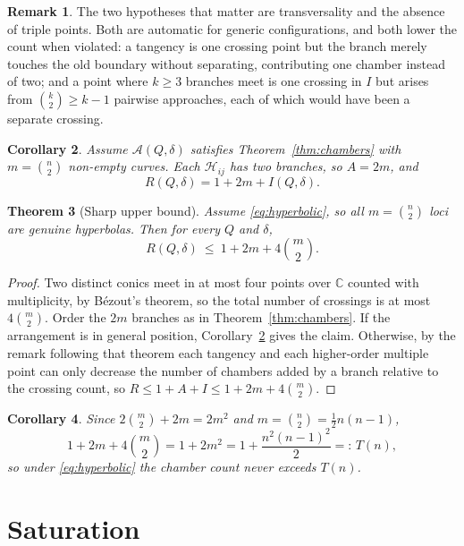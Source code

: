 ﻿\documentclass[11pt,a4paper]{article}
\newtheorem{theorem}{Theorem}[section]
\newtheorem{corollary}[theorem]{Corollary}
\theoremstyle{definition}
\newtheorem{remark}[theorem]{Remark}
\theoremstyle{remark}
\newcommand{\CC}{\mathbb{C}}
\newcommand{\HH}{\mathcal{H}}
\newcommand{\ARR}{\mathcal{A}}
\begin{document}
\begin{remark}
The two hypotheses that matter are transversality and the absence of triple
points.  Both are automatic for generic configurations, and both lower the count
when violated: a tangency is one crossing point but the branch merely touches the
old boundary without separating, contributing one chamber instead of two; and a
point where $k\ge3$ branches meet is one crossing in $I$ but arises from
$\binom k2\ge k-1$ pairwise approaches, each of which would have been a separate
crossing.
\end{remark}

\begin{corollary}\label{cor:formula}
Assume $\ARR(Q,\delta)$ satisfies Theorem~\ref{thm:chambers} with $m=\binom n2$
non-empty curves.  Each $\HH_{ij}$ has two branches, so $A=2m$, and
\[
R(Q,\delta)=1+2m+I(Q,\delta).
\]
\end{corollary}

\begin{theorem}[Sharp upper bound]\label{thm:upper}
Assume \eqref{eq:hyperbolic}, so all $m=\binom n2$ loci are genuine hyperbolas.
Then for every $Q$ and $\delta$,
\[
R(Q,\delta)\ \le\ 1+2m+4\binom m2 .
\]
\end{theorem}

\begin{proof}
Two distinct conics meet in at most four points over $\CC$ counted with
multiplicity, by B\'ezout's theorem, so the total number of crossings is at most
$4\binom m2$.  Order the $2m$ branches as in Theorem~\ref{thm:chambers}.  If the
arrangement is in general position, Corollary~\ref{cor:formula} gives the claim.
Otherwise, by the remark following that theorem each tangency and each
higher-order multiple point can only decrease the number of chambers added by a
branch relative to the crossing count, so $R\le1+A+I\le1+2m+4\binom m2$.
\end{proof}

\begin{corollary}\label{cor:ceiling}
Since $2\binom m2+2m=2m^2$ and $m=\binom n2=\tfrac12n(n-1)$,
\[
1+2m+4\binom m2=1+2m^{2}=1+\frac{n^{2}(n-1)^{2}}{2}=:\,T(n),
\]
so under \eqref{eq:hyperbolic} the chamber count never exceeds $T(n)$.
\end{corollary}

\section{Saturation}
\label{sec:saturation}
\end{document}
